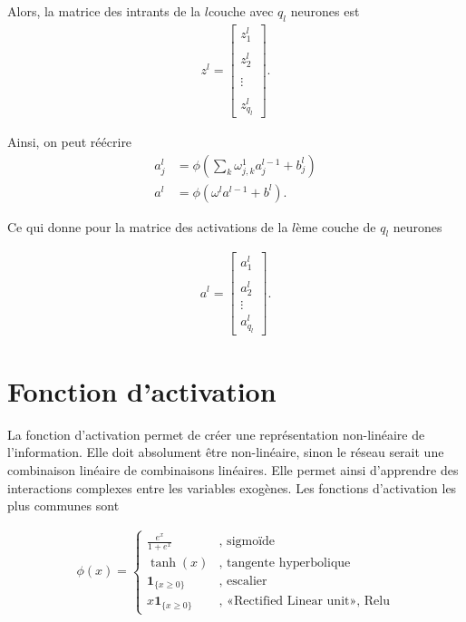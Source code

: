 Alors, la matrice des intrants de la $l$\ieme couche avec $q_l$ neurones est
\begin{align*}
z^l=
\begin{bmatrix}
z_1^l\\
\\
z_2^l\\
\\
\vdots \\
\\
z_{q_l}^l
\end{bmatrix}.
\end{align*}

Ainsi, on peut réécrire
\begin{align*}
a_j^l&= \phi \left( \sum_k \omega_{j,k}^1 a_j^{l-1} + b_j^l \right)\\
a^l&= \phi \left( \omega^l a^{l-1} + b^l \right).
\end{align*}

Ce qui donne pour la matrice des activations de la $l$ème couche de $q_l$ neurones

\begin{align*}
a^l=
\begin{bmatrix}
a_1^l\\
\\
a_2^l\\
\vdots \\
a_{q_l}^l
\end{bmatrix}.
\end{align*}


\section{Fonction d'activation}
\label{sec:RN:activation}

La fonction d'activation permet de créer une représentation non-linéaire de l'information.  Elle doit absolument être non-linéaire, sinon le réseau serait une combinaison linéaire de combinaisons linéaires. Elle permet ainsi d'apprendre des interactions complexes entre les variables exogènes. Les fonctions d'activation les plus communes sont

\begin{align*}
\phi(x)=
\begin{cases}
\frac{e^{x}}{1+e^{x}} &, \text{ sigmoïde} \\
\tanh (x) &,\text{ tangente hyperbolique}\\
\mathbf{1}_{\{x \geq 0\}} &, \text{ escalier} \\
x \mathbf{1}_{\{x \geq 0\}} &, \text{ «Rectified Linear unit», Relu}
\end{cases}
\end{align*}


